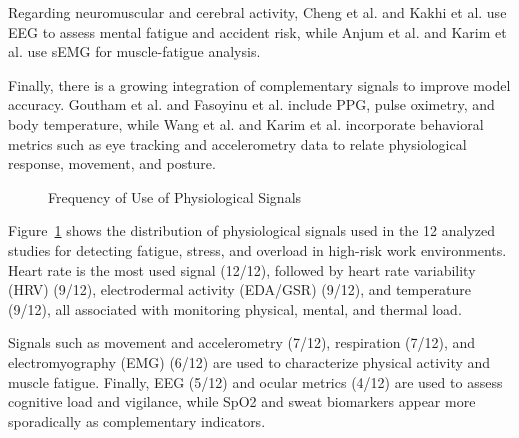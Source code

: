 \documentclass[runningheads]{llncs}
\begin{document}
Regarding neuromuscular and cerebral activity, Cheng et al. and Kakhi et al. \cite{cheng2025,kakhi2025} use EEG to assess mental fatigue and accident risk, while Anjum et al. and Karim et al. \cite{anjum2025,karim2025} use sEMG for muscle-fatigue analysis.

Finally, there is a growing integration of complementary signals to improve model accuracy. Goutham et al. and Fasoyinu et al. \cite{goutham2025,fasoyinu2025} include PPG, pulse oximetry, and body temperature, while Wang et al. and Karim et al. \cite{wang2024,karim2025} incorporate behavioral metrics such as eye tracking and accelerometry data to relate physiological response, movement, and posture.

\begin{figure}[H]
\centering
{}
\caption{Frequency of Use of Physiological Signals}
\label{fig:sinais}
\end{figure}

Figure~\ref{fig:sinais} shows the distribution of physiological signals used in the 12 analyzed studies for detecting fatigue, stress, and overload in high-risk work environments. Heart rate is the most used signal (12/12), followed by heart rate variability (HRV) (9/12), electrodermal activity (EDA/GSR) (9/12), and temperature (9/12), all associated with monitoring physical, mental, and thermal load.

Signals such as movement and accelerometry (7/12), respiration (7/12), and electromyography (EMG) (6/12) are used to characterize physical activity and muscle fatigue. Finally, EEG (5/12) and ocular metrics (4/12) are used to assess cognitive load and vigilance, while SpO2 and sweat biomarkers appear more sporadically as complementary indicators.
\end{document}
